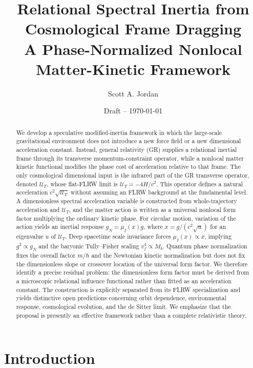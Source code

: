 \documentclass[11pt]{article}
\title{\textbf{Relational Spectral Inertia from Cosmological Frame Dragging}\\
\large A Phase-Normalized Nonlocal Matter-Kinetic Framework}
\author{Scott A. Jordan}
\date{Draft -- \today}
\newcommand{\UT}{\mathcal{U}_{T}}
\begin{document}
\maketitle

\begin{abstract}
We develop a speculative modified-inertia framework in which the large-scale gravitational environment does not introduce a new force field or a new dimensional acceleration constant. Instead, general relativity (GR) supplies a relational inertial frame through its transverse momentum-constraint operator, while a nonlocal matter kinetic functional modifies the phase cost of acceleration relative to that frame. The only cosmological dimensional input is the infrared part of the GR transverse operator, denoted $\UT$, whose flat-FLRW limit is $\UT=-4\dot H/c^2$. This operator defines a natural acceleration $c^2\sqrt{\UT}$ without assuming an FLRW background at the fundamental level. A dimensionless spectral acceleration variable is constructed from whole-trajectory acceleration and $\UT$, and the matter action is written as a universal nonlocal form factor multiplying the ordinary kinetic phase. For circular motion, variation of the action yields an inertial response $g_N=\mu_I(x)g$, where $x=g/(c^2\sqrt{u})$ for an eigenvalue $u$ of $\UT$. Deep spacetime scale invariance forces $\mu_I(x)\propto x$, implying $g^2\propto g_N$ and the baryonic Tully--Fisher scaling $v_f^4\propto M_b$. Quantum phase normalization fixes the overall factor $m/\hbar$ and the Newtonian kinetic normalization but does not fix the dimensionless slope or crossover location of the universal form factor. We therefore identify a precise residual problem: the dimensionless form factor must be derived from a microscopic relational influence functional rather than fitted as an acceleration constant. The construction is explicitly separated from its FLRW specialization and yields distinctive open predictions concerning orbit dependence, environmental response, cosmological evolution, and the de Sitter limit. We emphasize that the proposal is presently an effective framework rather than a complete relativistic theory.
\end{abstract}

\section{Introduction}
\end{document}
